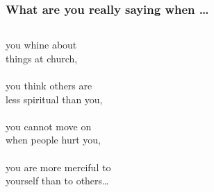 \documentclass{beamer}
\begin{document}
\begin{frame}

\frametitle{What are you really saying when \dots}
\begin{columns}
\column{4.5cm}
you whine about\\things at church,\\~\\

you think others are\\less spiritual than you,\\~\\

you cannot move on\\when people hurt you,\\~\\ 

you are more merciful to\\yourself than to others\dots\\~\\~\\
\centering{}
\column{5.5cm}
\end{columns}
~\\
\end{frame}
\end{document}

